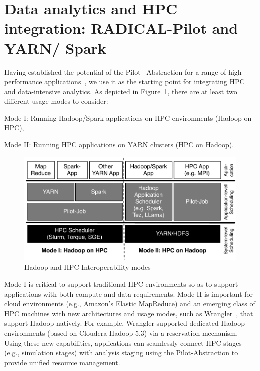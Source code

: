 \section{Data analytics and HPC integration: RADICAL-Pilot and YARN/ Spark}
\label{sec:integration_mode}
Having established the potential of the Pilot~-Abstraction for a range of high-performance applications~\cite{treikalis2016repex,ragothaman2014developing,ko2014numerical}, we use it as the starting point for integrating HPC and data-intensive analytics.
As depicted in Figure~\ref{fig:figures_hadoop-on-hpc-viceverse}, there are at least two different usage modes to consider:
\begin{inparaenum}[1)]
    \item Mode I: Running Hadoop/Spark applications on HPC environments (Hadoop on HPC),
    \item Mode II: Running HPC applications on YARN clusters (HPC on Hadoop).
\end{inparaenum}

\begin{figure}[t]
    \centering
    \includegraphics[width=.85\textwidth]{figures/data_analytics_hpc/hpc_hadoop/hadoop-on-hpc-viceverse.pdf}
    \caption{Hadoop and HPC Interoperability modes\label{fig:figures_hadoop-on-hpc-viceverse}}
\end{figure}

Mode I is critical to support traditional HPC environments so as to support applications with both compute and data requirements.
Mode II is important for cloud environments (e.g., Amazon's Elastic MapReduce) and an emerging class of HPC machines with new architectures and usage modes, such as Wrangler~\cite{wrangler}, that support Hadoop natively.
For example, Wrangler supported dedicated Hadoop environments (based on Cloudera Hadoop 5.3) via a reservation mechanism.
Using these new capabilities, applications can seamlessly connect HPC stages (e.g., simulation stages) with analysis staging using the Pilot-Abstraction to provide unified resource management.

